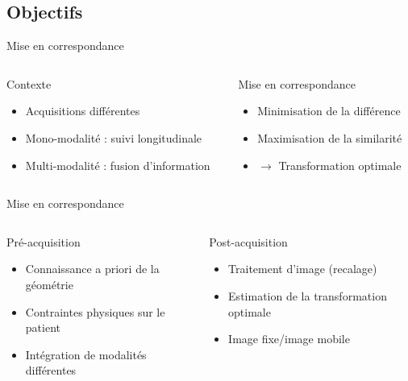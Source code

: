 \documentclass{beamer}
\begin{document}
\subsection{Objectifs}
\begin{frame}{Mise en correspondance}
  \begin{columns}[T]
 \begin{column}{0.5\textwidth}
\begin{block}{Contexte}
\begin{itemize}
  \item Acquisitions différentes
  \item Mono-modalité : suivi longitudinale
  \item Multi-modalité : fusion d'information
  \end{itemize}
\end{block}
 \end{column}
 \begin{column}{0.5\textwidth}
\begin{block}{Mise en correspondance}
\begin{itemize}
  \item Minimisation de la différence
  \item Maximisation de la similarité
  \item $\rightarrow$ Transformation optimale
  \end{itemize}
\end{block}
\end{column}
\end{columns}
\end{frame}

\begin{frame}{Mise en correspondance}
  \begin{columns}[T]
 \begin{column}{0.5\textwidth}
\begin{block}{Pré-acquisition}
\begin{itemize}
  \item Connaissance a priori de la géométrie
  \item Contraintes physiques sur le patient
  \item Intégration de modalités différentes
  \end{itemize}
\end{block}
 \end{column}
 \begin{column}{0.5\textwidth}
\begin{block}{Post-acquisition}
\begin{itemize}
  \item Traitement d'image (recalage)
  \item Estimation de la transformation optimale
  \item Image fixe/image mobile
  \end{itemize}
\end{block}
\end{column}
\end{columns}
\end{frame}
\end{document}
